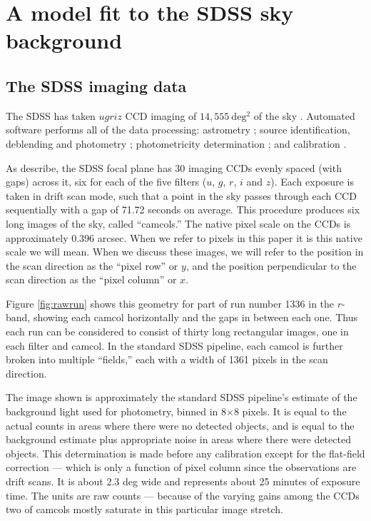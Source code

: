 \documentclass[10pt,preprint]{aastex}
\begin{document}
\section{A model fit to the SDSS sky background}
\label{sec:model}

\subsection{The SDSS imaging data}
\label{sec:data}

The SDSS has taken $ugriz$ CCD imaging of $14,555~\mathrm{deg^2}$ of
the sky \citep{york00a,aihara11a}.  Automated software performs all of
the data processing: astrometry \citep{pier03a}; source
identification, deblending and photometry \citep{lupton01a};
photometricity determination \citep{hogg01a}; and calibration
\citep{fukugita96a,smith02a, padmanabhan07b}.

As \citet{gunn05a} describe, the SDSS focal plane has 30 imaging CCDs
evenly spaced (with gaps) across it, six for each of the five filters
($u$, $g$, $r$, $i$ and $z$). Each exposure is taken in drift scan
mode, such that a point in the sky passes through each CCD
sequentially with a gap of 71.72 seconds on average.  This procedure
produces six long images of the sky, called ``camcols.'' The native
pixel scale on the CCDs is approximately 0.396 arcsec. When we refer
to pixels in this paper it is this native scale we will mean. When we
discuss these images, we will refer to the position in the scan
direction as the ``pixel row'' or $y$, and the position perpendicular
to the scan direction as the ``pixel column'' or $x$.

Figure \ref{fig:rawrun} shows this geometry for part of run number
1336 in the $r$-band, showing each camcol horizontally and the gaps in
between each one. Thus each run can be considered to consist of thirty
long rectangular images, one in each filter and camcol. In the
standard SDSS pipeline, each camcol is further broken into multiple
``fields,'' each with a width of 1361 pixels in the scan direction.

The image shown is approximately the standard SDSS pipeline's estimate
of the background light used for photometry, binned in 8$\times$8
pixels. It is equal to the actual counts in areas where there were no
detected objects, and is equal to the background estimate plus
appropriate noise in areas where there were detected objects. This
determination is made before any calibration except for the flat-field
correction --- which is only a function of pixel column since the
observations are drift scans.  It is about 2.3 deg wide and represents
about 25 minutes of exposure time. The units are raw counts ---
because of the varying gains among the CCDs two of camcols mostly
saturate in this particular image stretch.
\end{document}
